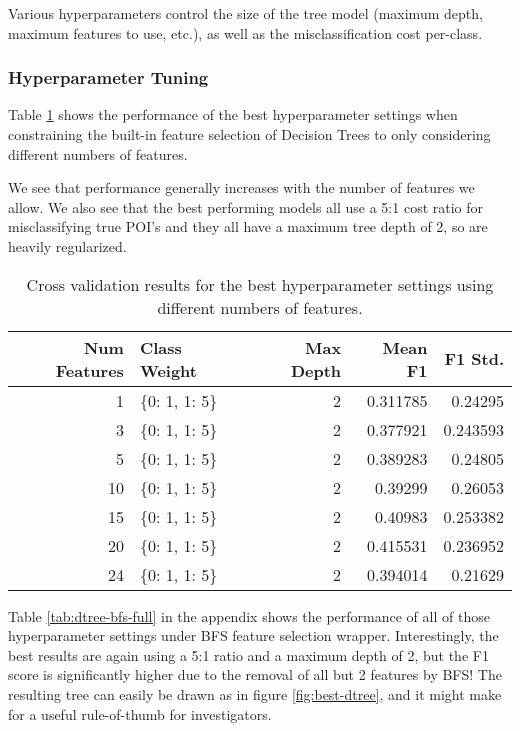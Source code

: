 \documentclass{article}
\begin{document}
Various hyperparameters control the size of the tree model (maximum depth, maximum features to use, etc.), as well as the misclassification cost per-class.

\subsubsection{Hyperparameter Tuning}

Table \ref{tab:dtree-builtin-summ} shows the performance of the best hyperparameter settings when constraining the built-in feature selection of Decision Trees to only considering different numbers of features.

We see that performance generally increases with the number of features we allow. We also see that the best performing models all use a 5:1 cost ratio for misclassifying true POI's and they all have a maximum tree depth of 2, so are heavily regularized.


\begin{table}[H]
\centering
\caption{Cross validation results for the best hyperparameter settings using different numbers of features.}
\label{tab:dtree-builtin-summ}
\begin{tabular}{rlrrr}
\hline
   Num Features & Class Weight   &   Max Depth &   Mean F1 &   F1 Std. \\
\hline
              1 & \{0: 1, 1: 5\}   &           2 &  0.311785 &  0.24295  \\
              3 & \{0: 1, 1: 5\}   &           2 &  0.377921 &  0.243593 \\
              5 & \{0: 1, 1: 5\}   &           2 &  0.389283 &  0.24805  \\
             10 & \{0: 1, 1: 5\}   &           2 &  0.39299  &  0.26053  \\
             15 & \{0: 1, 1: 5\}   &           2 &  0.40983  &  0.253382 \\
             20 & \{0: 1, 1: 5\}   &           2 &  0.415531 &  0.236952 \\
             24 & \{0: 1, 1: 5\}   &           2 &  0.394014 &  0.21629  \\
\hline
\end{tabular}
\end{table}

Table \ref{tab:dtree-bfs-full} in the appendix shows the performance of all of those hyperparameter settings under BFS feature selection wrapper. Interestingly, the best results are again using a 5:1 ratio and a maximum depth of 2, but the F1 score is significantly higher due to the removal of all but 2 features by BFS! The resulting tree can easily be drawn as in figure \ref{fig:best-dtree}, and it might make for a useful rule-of-thumb for investigators.
\end{document}
